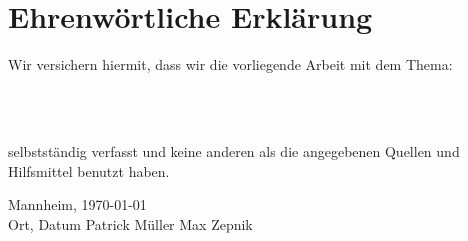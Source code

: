 
\chapter*{Ehrenwörtliche Erklärung}


Wir versichern hiermit, dass wir die vorliegende Arbeit  mit dem Thema:
\begin{center}
	\textsf{\textbf{\Large{}\DerTitelDerArbeit}} \\[0.3cm]
	\textsf{\textbf{\large{}\DerUnterTitelDerArbeit}} \\[1.5cm]
\end{center}
selbstständig verfasst und keine anderen als die angegebenen Quellen und Hilfsmittel benutzt haben.

\vspace{3cm}
Mannheim, \today
\\Ort, Datum \hfill Patrick Müller \hfill Max Zepnik